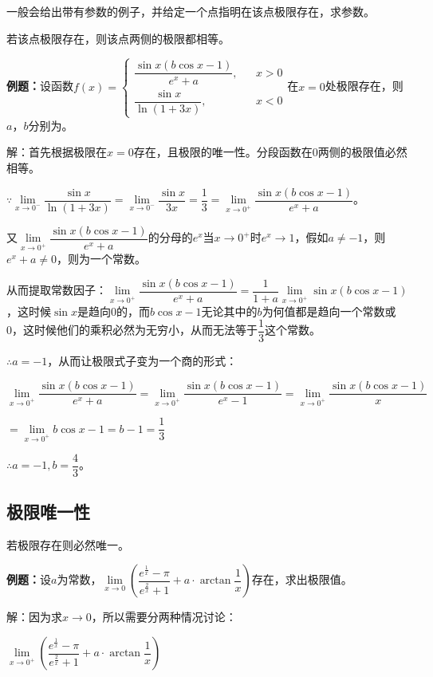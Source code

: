 \documentclass[UTF8, 12pt]{ctexart}
\begin{document}
一般会给出带有参数的例子，并给定一个点指明在该点极限存在，求参数。

若该点极限存在，则该点两侧的极限都相等。\medskip

\textbf{例题：}设函数$f(x)=\left\{\begin{array}{lcl}
    \dfrac{\sin x(b\cos x-1)}{e^x+a}, & & x>0 \\
    \dfrac{\sin x}{\ln(1+3x)}, & & x<0
\end{array}
\right.$在$x=0$处极限存在，则$a$，$b$分别为。

解：首先根据极限在$x=0$存在，且极限的唯一性。分段函数在0两侧的极限值必然相等。

$\because\lim\limits_{x\to 0^-}\dfrac{\sin x}{\ln(1+3x)}=\lim\limits_{x\to 0^-}\dfrac{\sin x}{3x}=\dfrac{1}{3}=\lim\limits_{x\to 0^+}\dfrac{\sin x(b\cos x-1)}{e^x+a}$。

\medskip

又$\lim\limits_{x\to 0^+}\dfrac{\sin x(b\cos x-1)}{e^x+a}$的分母的$e^x$当$x\to 0^+$时$e^x\to 1$，假如$a\neq-1$，则$e^x+a\neq 0$，则为一个常数。

从而提取常数因子：$\lim\limits_{x\to 0^+}\dfrac{\sin x(b\cos x-1)}{e^x+a}=\dfrac{1}{1+a}\lim\limits_{x\to 0^+}\sin x(b\cos x-1)$，这时候$\sin x$是趋向0的，而$b\cos x-1$无论其中的$b$为何值都是趋向一个常数或0，这时候他们的乘积必然为无穷小，从而无法等于$\dfrac{1}{3}$这个常数。

$\therefore a=-1$，从而让极限式子变为一个商的形式：\medskip

$\lim\limits_{x\to 0^+}\dfrac{\sin x(b\cos x-1)}{e^x+a}=\lim\limits_{x\to 0^+}\dfrac{\sin x(b\cos x-1)}{e^x-1}=\lim\limits_{x\to 0^+}\dfrac{\sin x(b\cos x-1)}{x}$\medskip

$=\lim\limits_{x\to 0^+}b\cos x-1=b-1=\dfrac{1}{3}$\medskip

$\therefore a=-1,b=\dfrac{4}{3}$。

\subsection{极限唯一性}

若极限存在则必然唯一。

\textbf{例题：}设$a$为常数，$\lim\limits_{x\to 0}\left(\dfrac{e^{\frac{1}{x}}-\pi}{e^{\frac{2}{x}}+1}+a\cdot\arctan\dfrac{1}{x}\right)$存在，求出极限值。

解：因为求$x\to 0$，所以需要分两种情况讨论：

\medskip

$\lim\limits_{x\to 0^+}\left(\dfrac{e^{\frac{1}{x}}-\pi}{e^{\frac{2}{x}}+1}+a\cdot\arctan\dfrac{1}{x}\right)$
\end{document}

